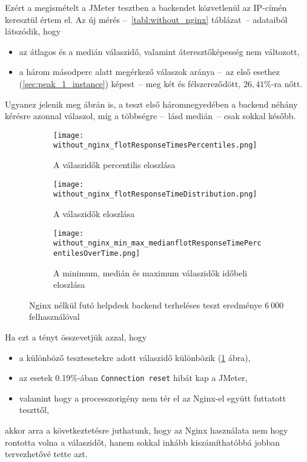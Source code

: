 Ezért a megismételt a JMeter tesztben a backendet közvetlenül az IP-címén keresztül értem el. Az új mérés --~\ref{tabl:without_nginx} táblázat~--   adataiból látszódik, hogy

\begin{itemize}
	\item az átlagos és a medián válaszidő, valamint áteresztőképesség nem változott,
	\item a három másodperc alatt megérkező válaszok aránya --~az első esethez (\ref{sec:peak_1_instance}) képest~--   meg két és félszereződött, $26,41\%$-ra nőtt.
\end{itemize}



Ugyanez jelenik meg  ábrán is, a teszt első háromnegyedében a backend néhány kérésre azonnal válaszol, míg a többségre --~lásd medián~--   csak sokkal később.

\begin{figure}[hbt]
	\begin{subfigure}{.49\textwidth}
		\centering
		\texttt{[image: without\_nginx\_flotResponseTimesPercentiles.png]}  
		\caption{A válaszidők percentilis eloszlása}
		\label{fig:without_nginx_percentil}
	\end{subfigure}
	\begin{subfigure}{.49\textwidth}
		\centering
		\texttt{[image: without\_nginx\_flotResponseTimeDistribution.png]}  
		\caption{A válaszidők eloszlása}
	\end{subfigure}
	
	\quad
	
	\begin{subfigure}{.95\textwidth}
		\centering
		\texttt{[image: without\_nginx\_min\_max\_medianflotResponseTimePercentilesOverTime.png]}  
		\caption{A minimum, medián és maximum válaszidők időbeli eloszlása}
		\label{fig:without_nginx_min_median_max_over_time}
	\end{subfigure}
	
	\caption[Helpdesk backend terheléses teszt Nginx nélkül]{Nginx nélkül futó helpdesk backend terheléses teszt eredménye $6~000$ felhasználóval}
\end{figure}


Ha ezt a tényt összevetjük azzal, hogy
\begin{itemize}
	\item a különböző tesztesetekre adott válaszidő különbözik (\ref{fig:without_nginx_percentil} ábra),
	\item az esetek 0.19\%-ában \texttt{Connection reset} hibát kap a JMeter,
	\item valamint hogy a processzorigény nem tér el az Nginx-el együtt futtatott teszttől,
\end{itemize}
akkor arra a következtetésre juthatunk, hogy az Nginx használata nem hogy rontotta volna a válaszidőt, hanem sokkal inkább kiszámíthatóbbá jobban tervezhetővé tette azt.


